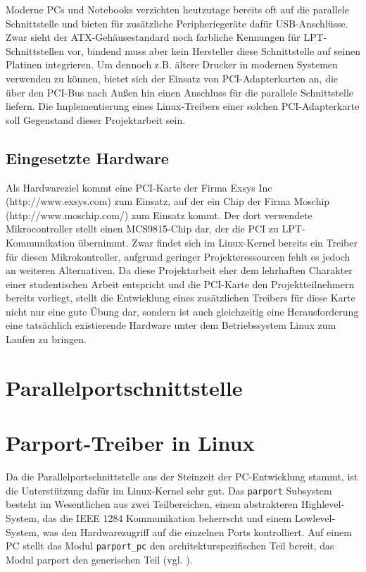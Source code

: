 \documentclass[a4paper,11pt]{article}
\begin{document}
Moderne PCs und Notebooks verzichten heutzutage bereits oft auf die parallele Schnittstelle und bieten für zusätzliche Peripheriegeräte dafür USB-Anschlüsse. Zwar sieht der ATX-Gehäusestandard noch farbliche Kennungen für LPT-Schnittstellen vor, bindend muss aber kein Hersteller diese Schnittstelle auf seinen Platinen integrieren. Um dennoch z.B. ältere Drucker in modernen Systemen verwenden zu können, bietet sich der Einsatz von PCI-Adapterkarten an, die über den PCI-Bus nach Außen hin einen Anschluss für die parallele Schnittstelle liefern. Die Implementierung eines Linux-Treibers einer solchen PCI-Adapterkarte soll Gegenstand dieser Projektarbeit sein. 

\subsection{Eingesetzte Hardware}  

Als Hardwareziel kommt eine PCI-Karte der Firma Exsys Inc (http://www.exsys.com) zum Einsatz, auf der ein Chip der Firma Moschip (http://www.moschip.com/) zum Einsatz kommt. Der dort verwendete Mikrocontroller stellt einen MCS9815-Chip dar, der die PCI zu LPT-Kommunikation übernimmt. Zwar findet sich im Linux-Kernel bereits ein Treiber für diesen Mikrokontroller, aufgrund geringer Projekteressourcen fehlt es jedoch an weiteren Alternativen. Da diese Projektarbeit eher dem lehrhaften Charakter einer studentischen Arbeit entspricht und die PCI-Karte den Projektteilnehmern bereits vorliegt, stellt die Entwicklung eines zusätzlichen Treibers für diese Karte nicht nur eine gute Übung dar, sondern ist auch gleichzeitig eine Herausforderung eine tatsächlich existierende Hardware unter dem Betriebssystem Linux zum Laufen zu bringen.  

\section{Parallelportschnittstelle}

\section{Parport-Treiber in Linux}

Da die Parallelportschnittstelle aus der Steinzeit der PC-Entwicklung stammt, ist die Unterstützung
dafür im Linux-Kernel sehr gut. 
Das \verb|parport| Subsystem besteht im Wesentlichen aus zwei Teilbereichen, einem abstrakteren Highlevel-System, das
die IEEE 1284 Kommunikation beherrscht und einem Lowlevel-System, was den Hardwarezugriff auf die einzelnen Ports
kontrolliert. Auf einem PC stellt das Modul \verb|parport_pc| den architekturspezifischen Teil bereit, das Modul parport 
den generischen Teil (vgl. \cite{net:1}).
\end{document}
